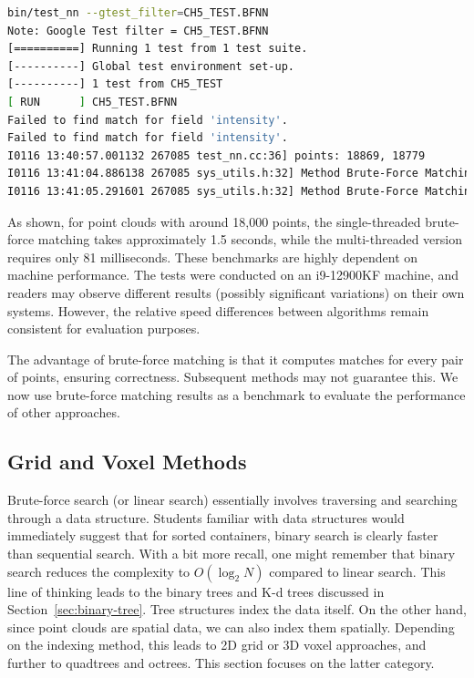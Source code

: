 \begin{lstlisting}[language=sh,caption=Terminal output]
bin/test_nn --gtest_filter=CH5_TEST.BFNN 
Note: Google Test filter = CH5_TEST.BFNN
[==========] Running 1 test from 1 test suite.
[----------] Global test environment set-up.
[----------] 1 test from CH5_TEST
[ RUN      ] CH5_TEST.BFNN
Failed to find match for field 'intensity'.
Failed to find match for field 'intensity'.
I0116 13:40:57.001132 267085 test_nn.cc:36] points: 18869, 18779
I0116 13:41:04.886138 267085 sys_utils.h:32] Method Brute-Force Matching (Single-threaded) average call time/iterations: 1576.98/5 ms.
I0116 13:41:05.291601 267085 sys_utils.h:32] Method Brute-Force Matching (Multi-threaded) average call time/iterations: 81.0873/5 ms.
\end{lstlisting}

As shown, for point clouds with around 18,000 points, the single-threaded brute-force matching takes approximately 1.5 seconds, while the multi-threaded version requires only 81 milliseconds. These benchmarks are highly dependent on machine performance. The tests were conducted on an i9-12900KF machine, and readers may observe different results (possibly significant variations) on their own systems. However, the relative speed differences between algorithms remain consistent for evaluation purposes. 

The advantage of brute-force matching is that it computes matches for every pair of points, ensuring correctness. Subsequent methods may not guarantee this. We now use brute-force matching results as a benchmark to evaluate the performance of other approaches.

\subsection{Grid and Voxel Methods}
Brute-force search (or linear search) essentially involves traversing and searching through a data structure. Students familiar with data structures would immediately suggest that for sorted containers, binary search is clearly faster than sequential search. With a bit more recall, one might remember that binary search reduces the complexity to \(O(\log_2 N)\) compared to linear search. This line of thinking leads to the binary trees and K-d trees discussed in Section~\ref{sec:binary-tree}. Tree structures index the data itself. On the other hand, since point clouds are spatial data, we can also index them spatially. Depending on the indexing method, this leads to 2D grid or 3D voxel approaches, and further to quadtrees and octrees. This section focuses on the latter category.

